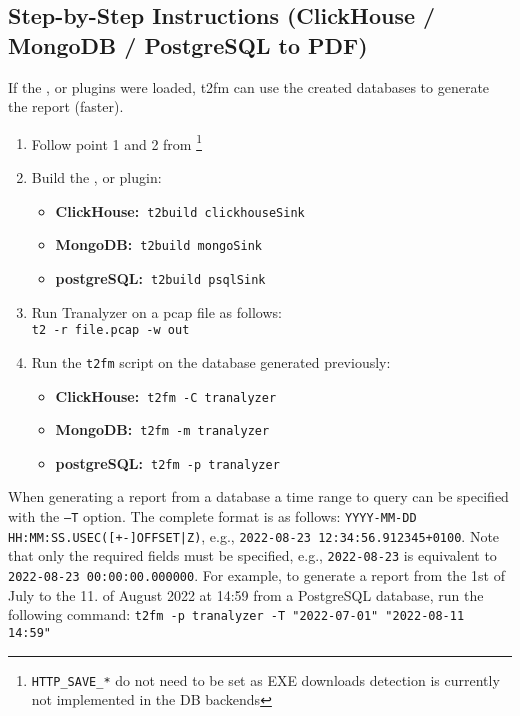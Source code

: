 \documentclass[documentation]{subfiles}
\begin{document}
\subsection{Step-by-Step Instructions (ClickHouse / MongoDB / PostgreSQL to PDF)}
If the ,  or  plugins were loaded, t2fm can use the created databases to generate the report (faster).
\begin{enumerate}
    \item Follow point 1 and 2 from \footnote{{\tt HTTP\_SAVE\_*} do not need to be set as EXE downloads detection is currently not implemented in the DB backends}
    \item Build the ,  or  plugin:
        \begin{itemize}
            \item {\bf ClickHouse:~}{\tt t2build clickhouseSink}\\
            \item {\bf MongoDB:~}{\tt t2build mongoSink}\\
            \item {\bf postgreSQL:~}{\tt t2build psqlSink}\\
        \end{itemize}
    \item Run Tranalyzer on a pcap file as follows:\\
        {\tt t2 -r file.pcap -w out}
    \item Run the {\tt t2fm} script on the database generated previously:
        \begin{itemize}
            \item {\bf ClickHouse:~}{\tt t2fm -C tranalyzer}
            \item {\bf MongoDB:~}{\tt t2fm -m tranalyzer}
            \item {\bf postgreSQL:~}{\tt t2fm -p tranalyzer}
        \end{itemize}
\end{enumerate}

When generating a report from a database a time range to query can be specified with the {\tt --T} option.
The complete format is as follows: {\tt YYYY-MM-DD HH:MM:SS.USEC([+-]OFFSET|Z)}, e.g., {\tt 2022-08-23 12:34:56.912345+0100}.
Note that only the required fields must be specified, e.g., {\tt 2022-08-23} is equivalent to {\tt 2022-08-23 00:00:00.000000}.
For example, to generate a report from the 1st of July to the 11. of August 2022 at 14:59 from a PostgreSQL database, run the following command:
{\tt t2fm -p tranalyzer -T "2022-07-01"  "2022-08-11 14:59"}
\end{document}
